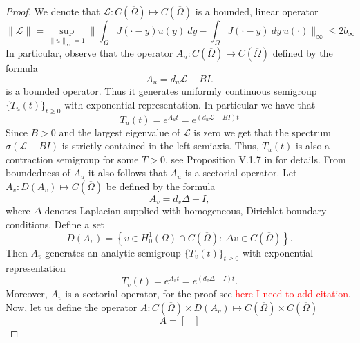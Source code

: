 \documentclass[12pt, a4paper]{article}
\theoremstyle{break}
\theoremstyle{break}
\theoremstyle{break}
\theoremstyle{break}
\theoremstyle{break}
\theoremstyle{break}
\theoremstyle{break}
\begin{document}
\begin{proof}
    We denote that $\mathcal{L}: C(\overline{\Omega}) \mapsto C(\overline{\Omega})$ is a bounded, linear operator
    \begin{equation}
        \| \mathcal{L} \| = \sup_{\|u\|_\infty = 1} \| \int_\Omega J(\cdot - y) u(y)\:dy - \int_\Omega J(\cdot - y)\:dy\: u(\cdot) \|_\infty \leq 2 b_\infty
    \end{equation}
    In particular, observe that the operator $A_u : C(\overline{\Omega}) \mapsto C(\overline{\Omega})$ defined by the formula
    \begin{equation}
        A_u = d_u \mathcal{L} - B I.
    \end{equation}
    is a bounded operator. Thus it generates uniformly continuous semigroup $\{T_u(t)\}_{t \geq 0}$ with exponential representation. In particular we have that
    \begin{equation}
        T_u(t) = e^{A_u t} = e^{(d_u \mathcal{L} - B I) t}
    \end{equation}
    Since $B > 0$ and the largest eigenvalue of $\mathcal{L}$ is zero we get that the spectrum $\sigma(\mathcal{L} - B I)$ is strictly contained in the left semiaxis. Thus, $T_u(t)$ is also a contraction semigroup for some $T > 0$, see Proposition V.1.7 in \cite{EngelNagel2000} for details. From boundedness of $A_u$ it also follows that $A_u$ is a sectorial operator. Let $A_v: D(A_v) \mapsto C(\overline{\Omega})$ be defined by the formula
    \begin{equation}
        A_v = d_v\Delta - I, 
    \end{equation}
    where $\Delta$ denotes Laplacian supplied with homogeneous, Dirichlet boundary conditions. Define a set
    \begin{equation}
        D(A_v) = \left\{ v \in H^1_0(\Omega) \cap C(\overline{\Omega}):\: \Delta v \in C(\overline{\Omega}) \right\}.
    \end{equation}
    Then $A_v$ generates an analytic semigroup $\{T_v(t)\}_{t\geq 0}$ with exponential representation 
    \begin{equation}
        T_v(t) = e^{A_v t} = e^{(d_v \Delta - I) t}.
    \end{equation}
    Moreover, $A_v$ is a sectorial operator, for the proof see \textcolor{red}{here I need to add citation}. Now, let us define the operator $A: C(\overline{\Omega}) \times D(A_v) \mapsto C(\overline{\Omega}) \times C(\overline{\Omega})$
    \begin{equation}
        A = 
        \begin{bmatrix}

\end{bmatrix}
\end{equation}
\end{proof}
\end{document}
